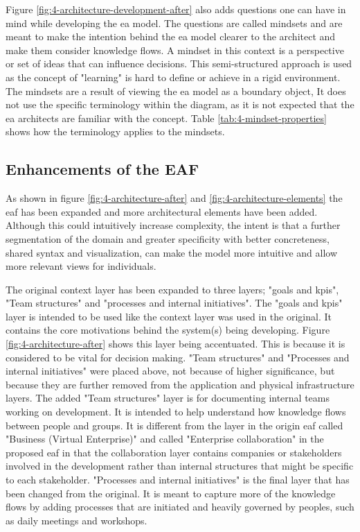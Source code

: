 
Figure \ref{fig:4-architecture-development-after} also adds questions one can have in mind while developing the \gls{ea} model. The questions are called mindsets and are meant to make the intention behind the \gls{ea} model clearer to the architect and make them consider knowledge flows. A mindset in this context is a perspective or set of ideas that can influence decisions. This semi-structured approach is used as the concept of "learning" is hard to define or achieve in a rigid environment. The mindsets are a result of viewing the \gls{ea} model as a \gls{boundary object}, It does not use the specific terminology within the diagram, as it is not expected that the \gls{ea} architects are familiar with the concept. Table \ref{tab:4-mindset-properties} shows how the terminology applies to the mindsets. 

\subsection{Enhancements of the EAF}


As shown in figure \ref{fig:4-architecture-after} and \ref{fig:4-architecture-elements} the \gls{eaf} has been expanded and more architectural elements have been added. Although this could intuitively increase complexity, the intent is that a further segmentation of the domain and greater specificity with better concreteness, shared syntax and visualization, can make the model more intuitive and allow more relevant views for individuals. 

The original context layer has been expanded to three layers; "goals and \glspl{kpi}", "Team structures" and "processes and internal initiatives". The "goals and \glspl{kpi}" layer is intended to be used like the context layer was used in the original. It contains the core motivations behind the system(s) being developing. Figure \ref{fig:4-architecture-after} shows this layer being accentuated. This is because it is considered to be vital for decision making. "Team structures" and "Processes and internal initiatives" were placed above, not because of higher significance, but because they are further removed from the application and physical infrastructure layers. The added "Team structures" layer is for documenting internal teams working on development. It is intended to help understand how knowledge flows between people and groups. It is different from the layer in the origin \gls{eaf} called "Business (Virtual Enterprise)" and called "Enterprise collaboration" in the proposed \gls{eaf} in that the collaboration layer contains companies or stakeholders involved in the development rather than internal structures that might be specific to each stakeholder. "Processes and internal initiatives" is the final layer that has been changed from the original. It is meant to capture more of the knowledge flows by adding processes that are initiated and heavily governed by peoples, such as daily meetings and workshops. 

